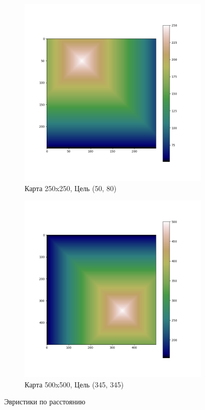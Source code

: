 \documentclass{article}
\numberwithin{equation}{section}
\begin{document}
			\begin{figure}[H]
				\vspace{-0.5cm}
				\centering
				\begin{subfigure}[b]{0.49\textwidth}
					\includegraphics[width=\textwidth]{data/heuristics_example/heuristic_d_250x250.png}
					\caption*{Карта 250x250, Цель (50, 80)}
				\end{subfigure}
				\begin{subfigure}[b]{0.49\textwidth}
					\includegraphics[width=\textwidth]{data/heuristics_example/heuristic_d_500x500.png}
					\caption*{Карта 500x500, Цель (345, 345)}
				\end{subfigure}
				\caption{Эвристики по расстоянию}\label{fig:heur_d}
			\end{figure}
\end{document}

